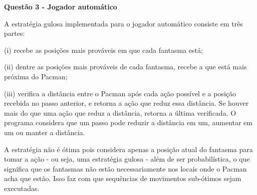 \documentclass{article}
\begin{document}
\bigskip
\textbf{Questão 3 - Jogador automático}

\quad A estratégia gulosa implementada para o jogador automático consiste em três partes:

\bigskip
\qquad (i) recebe as posições mais prováveis em que cada fantasma está;

\qquad (ii) dentre as posições mais prováveis de cada fantasma, recebe a que está mais próxima do Pacman;

\qquad (iii) verifica a distância entre o Pacman após cada ação possível e a posição recebida no passo anterior, e retorna a ação que reduz essa distância. Se houver mais do que uma ação que reduz a distância, retorna a última verificada. O programa considera que um passo pode reduzir a distância em um, aumentar em um ou manter a distância.

\bigskip
\quad A estratégia não é ótima pois considera apenas a posição atual do fantasma para tomar a ação - ou seja, uma estratégia gulosa - além de ser probabilística, o que significa que os fantasmas não estão necessariamente nos locais onde o Pacman acha que estão. Isso faz com que sequências de movimentos sub-ótimos sejam executadas.
\end{document}

